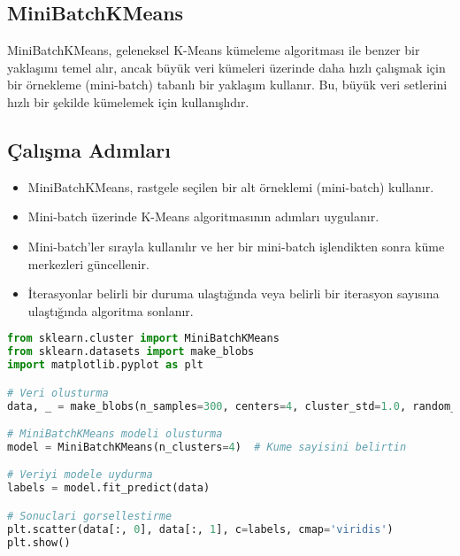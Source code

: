 \subsection{MiniBatchKMeans}
MiniBatchKMeans, geleneksel K-Means kümeleme algoritması ile benzer bir yaklaşımı temel alır, ancak büyük veri kümeleri üzerinde daha hızlı çalışmak için bir örnekleme (mini-batch) tabanlı bir yaklaşım kullanır. Bu, büyük veri setlerini hızlı bir şekilde kümelemek için kullanışlıdır.

\subsection{Çalışma Adımları}
\begin{itemize}
    \item MiniBatchKMeans, rastgele seçilen bir alt örneklemi (mini-batch) kullanır.
    \item Mini-batch üzerinde K-Means algoritmasının adımları uygulanır.
    \item Mini-batch'ler sırayla kullanılır ve her bir mini-batch işlendikten sonra küme merkezleri güncellenir.
    \item İterasyonlar belirli bir duruma ulaştığında veya belirli bir iterasyon sayısına ulaştığında algoritma sonlanır.
\end{itemize}

\begin{lstlisting}[language=Python, caption=Scikit-learn'de MiniBatchKMeans.]
from sklearn.cluster import MiniBatchKMeans
from sklearn.datasets import make_blobs
import matplotlib.pyplot as plt

# Veri olusturma
data, _ = make_blobs(n_samples=300, centers=4, cluster_std=1.0, random_state=42)

# MiniBatchKMeans modeli olusturma
model = MiniBatchKMeans(n_clusters=4)  # Kume sayisini belirtin

# Veriyi modele uydurma
labels = model.fit_predict(data)

# Sonuclari gorsellestirme
plt.scatter(data[:, 0], data[:, 1], c=labels, cmap='viridis')
plt.show()
\end{lstlisting}

